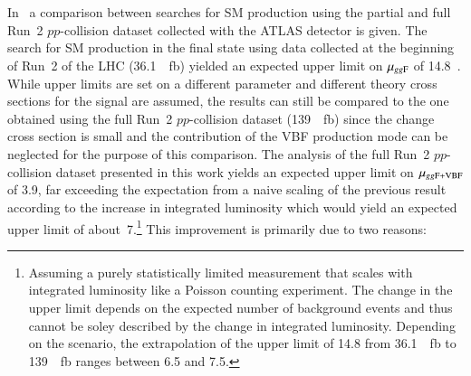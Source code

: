 In~ a comparison
between searches for SM \HH production using the partial and full
Run~2 $pp$-collision dataset collected with the ATLAS detector is
given. The search for SM \HH production in the \bbtautau final state
using data collected at the beginning of Run~2 of the LHC
(\SI{36.1}{\per\femto\barn}) yielded an expected upper limit on
$\mu_{gg\text{F}}$ of 14.8~\cite{HIGG-2016-16-witherratum}. While upper
limits are set on a different parameter and different theory cross
sections for the signal are assumed, the results can still be compared
to the one obtained using the full Run~2 $pp$-collision dataset
(\SI{139}{\per\femto\barn}) since the change cross section is small
and the contribution of the VBF production mode can be neglected for
the purpose of this comparison. The analysis of the full Run~2
$pp$-collision dataset presented in this work yields an expected upper
limit on $\mu_{gg\text{F}+\text{VBF}}$ of 3.9, far exceeding the expectation
from a naive scaling of the previous result according to the increase
in integrated luminosity which would yield an expected upper limit of
about~7.\footnote{Assuming a purely statistically limited measurement
  that scales with integrated luminosity like a Poisson counting
  experiment. The change in the upper limit depends on the expected
  number of background events and thus cannot be soley described by
  the change in integrated luminosity. Depending on the scenario, the
  extrapolation of the upper limit of \num{14.8} from
  \SI{36.1}{\per\femto\barn} to \SI{139}{\per\femto\barn} ranges
  between \num{6.5} and \num{7.5}.}  This improvement is primarily due
to two reasons:
